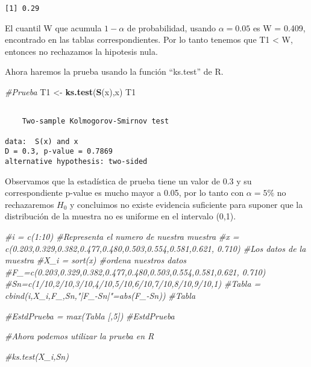 \documentclass[a4paper,oneside,openany]{book}
\newenvironment{Shaded}{\begin{snugshade}}{\end{snugshade}}
\newcommand{\KeywordTok}[1]{\textcolor[rgb]{0.13,0.29,0.53}{\textbf{#1}}}
\newcommand{\StringTok}[1]{\textcolor[rgb]{0.31,0.60,0.02}{#1}}
\newcommand{\CommentTok}[1]{\textcolor[rgb]{0.56,0.35,0.01}{\textit{#1}}}
\newcommand{\NormalTok}[1]{#1}
\begin{document}
\begin{verbatim}
[1] 0.29
\end{verbatim}

El cuantil W que acumula \(1-\alpha\) de probabilidad, usando
\(\alpha=0.05\) es W = 0.409, encontrado en las tablas correspondientes.
Por lo tanto tenemos que T1 \textless{} W, entonces no rechazamos la
hipotesis nula.

Ahora haremos la prueba usando la función ``ks.test'' de R.

\begin{Shaded}
\begin{Highlighting}[]
\CommentTok{#Prueba}
\NormalTok{T1 <-}\StringTok{ }\KeywordTok{ks.test}\NormalTok{(}\KeywordTok{S}\NormalTok{(x),x)}
\NormalTok{T1}
\end{Highlighting}
\end{Shaded}

\begin{verbatim}

    Two-sample Kolmogorov-Smirnov test

data:  S(x) and x
D = 0.3, p-value = 0.7869
alternative hypothesis: two-sided
\end{verbatim}

Observamos que la estadística de prueba tiene un valor de 0.3 y su
correspondiente p-value es mucho mayor a 0.05, por lo tanto con
\(\alpha=5\%\) no rechazaremos \(H_0\) y concluimos no existe evidencia
suficiente para suponer que la distribución de la muestra no es uniforme
en el intervalo (0,1).

\begin{Shaded}
\begin{Highlighting}[]
\CommentTok{#i = c(1:10) #Representa el numero de nuestra muestra}
\CommentTok{#x = c(0.203,0.329,0.382,0.477,0.480,0.503,0.554,0.581,0.621, 0.710) #Los datos de la muestra}
\CommentTok{#X_i = sort(x) #ordena nuestros datos}
\CommentTok{#F_=c(0.203,0.329,0.382,0.477,0.480,0.503,0.554,0.581,0.621, 0.710)}
\CommentTok{#Sn=c(1/10,2/10,3/10,4/10,5/10,6/10,7/10,8/10,9/10,1)}
\CommentTok{#Tabla = cbind(i,X_i,F_,Sn,"|F_-Sn|"=abs(F_-Sn))}
\CommentTok{#Tabla}

\CommentTok{#EstdPrueba = max(Tabla [,5])}
\CommentTok{#EstdPrueba}

\CommentTok{#Ahora podemos utilizar la prueba en R}

\CommentTok{#ks.test(X_i,Sn)}
\end{Highlighting}
\end{Shaded}
\end{document}
